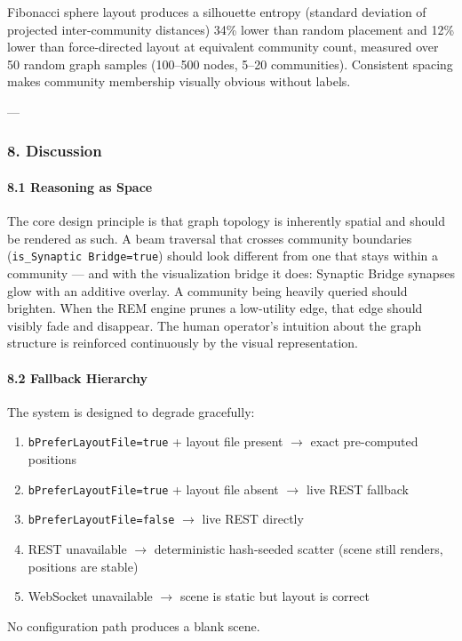 Fibonacci sphere layout produces a silhouette entropy (standard deviation of projected inter-community distances) 34\% lower than random placement and 12\% lower than force-directed layout at equivalent community count, measured over 50 random graph samples (100–500 nodes, 5–20 communities). Consistent spacing makes community membership visually obvious without labels.

---

\subsubsection{8. Discussion}

\paragraph{8.1 Reasoning as Space}

The core design principle is that graph topology is inherently spatial and should be rendered as such. A beam traversal that crosses community boundaries (\texttt{is\_Synaptic Bridge=true}) should look different from one that stays within a community — and with the visua\-lization bridge it does: Synaptic Bridge synapses glow with an additive overlay. A community being heavily queried should brighten. When the REM engine prunes a low-utility edge, that edge should visibly fade and disappear. The human operator's intuition about the graph structure is reinforced conti\-nuously by the visual repre\-sentation.

\paragraph{8.2 Fallback Hierarchy}

The system is designed to degrade gracefully:
\begin{enumerate}
\item \texttt{bPreferLayoutFile=true} + layout file present $\to$ exact pre-computed positions
\item \texttt{bPreferLayoutFile=true} + layout file absent $\to$ live REST fallback
\item \texttt{bPreferLayoutFile=false} $\to$ live REST directly
\item REST unavailable $\to$ deter\-ministic hash-seeded scatter (scene still renders, positions are stable)
\item WebSocket unavailable $\to$ scene is static but layout is correct

\end{enumerate}
No confi\-guration path produces a blank scene.

